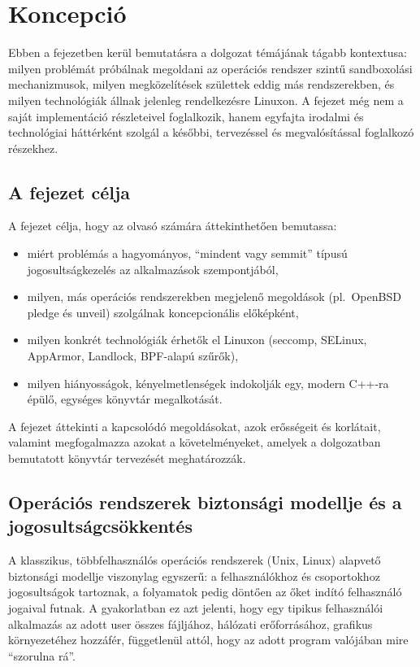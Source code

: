 \chapter{Koncepció}

Ebben a fejezetben kerül bemutatásra a dolgozat témájának tágabb kontextusa:
milyen problémát próbálnak megoldani az operációs rendszer szintű sandboxolási
mechanizmusok, milyen megközelítések születtek eddig más rendszerekben, és
milyen technológiák állnak jelenleg rendelkezésre Linuxon. A fejezet még nem a
saját implementáció részleteivel foglalkozik, hanem egyfajta irodalmi és
technológiai háttérként szolgál a későbbi, tervezéssel és megvalósítással
foglalkozó részekhez.


\section{A fejezet célja}

A fejezet célja, hogy az olvasó számára áttekinthetően bemutassa:

\begin{itemize}
  \item miért problémás a hagyományos, ``mindent vagy semmit'' típusú
        jogosultságkezelés az alkalmazások szempontjából,
  \item milyen, más operációs rendszerekben megjelenő megoldások (pl.\ OpenBSD
        pledge és unveil) szolgálnak koncepcionális
        előképként,
  \item milyen konkrét technológiák érhetők el Linuxon (seccomp, SELinux,
        AppArmor, Landlock, BPF-alapú szűrők),
  \item milyen hiányosságok, kényelmetlenségek indokolják egy, modern C++-ra
        épülő, egységes könyvtár megalkotását.
\end{itemize}

A fejezet áttekinti a kapcsolódó
megoldásokat, azok erősségeit és korlátait, valamint megfogalmazza azokat a
követelményeket, amelyek a dolgozatban bemutatott könyvtár tervezését
meghatározzák.


\section{Operációs rendszerek biztonsági modellje és a jogosultságcsökkentés}

A klasszikus, többfelhasználós operációs rendszerek (Unix, Linux) alapvető
biztonsági modellje viszonylag egyszerű: a felhasználókhoz és csoportokhoz
jogosultságok tartoznak, a folyamatok pedig döntően az őket indító felhasználó
jogaival futnak. A gyakorlatban ez azt jelenti, hogy egy tipikus felhasználói
alkalmazás az adott user összes fájljához, hálózati erőforrásához, grafikus
környezetéhez hozzáfér, függetlenül attól, hogy az adott program valójában mire
``szorulna rá''.

